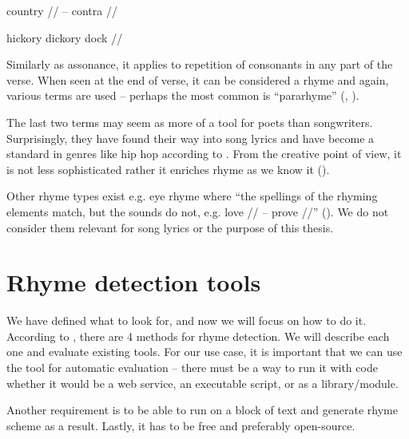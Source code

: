 country // -- contra //

hickory dickory dock //

\noindent Similarly as assonance, it applies to repetition of consonants in any part of the verse. When seen at the end of verse, it can be considered a rhyme and again, various terms are used -- perhaps the most common is ``pararhyme'' (\cite{britannica}, \cite{oxforddict2008literary}).
\newline

The last two terms may seem as more of a tool for poets than songwriters. Surprisingly, they have found their way into song lyrics and have become a standard in genres like hip hop according to \cite{vanphonological}. From the creative point of view, it is not less sophisticated rather it enriches rhyme as we know it (\cite{brogan2016poeticterms}).


Other rhyme types exist e.g. eye rhyme where ``the spellings of the rhyming elements match, but the sounds do not, e.g. love // -- prove //'' (\cite{oxforddict2008literary}). We do not consider them relevant for song lyrics or the purpose of this thesis.


\section{Rhyme detection tools}\label{rhyme_detection_tools}
We have defined what to look for, and now we will focus on how to do it. According to \cite{plechac2017presentation}, there are 4 methods for rhyme detection. We will describe each one and evaluate existing tools. For our use case, it is important that we can use the tool for automatic evaluation -- there must be a way to run it with code whether it would be a web service,  an executable script, or as a library/module.

Another requirement is to be able to run on a block of text and generate rhyme scheme as a result. Lastly, it has to be free and preferably open-source.

